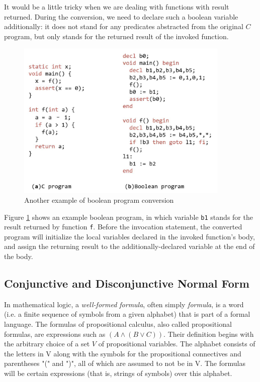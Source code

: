 \documentclass[10pt,journal,final,]{article}
\theoremstyle{definition}
\begin{document}
It would be a little tricky when we are dealing with functions with result returned. During the conversion, we need to declare such a boolean variable additionally: it does not stand for any predicates abstracted from the original $C$ program, but only stands for the returned result of the invoked function.

\begin{figure}
\centering
\includegraphics[width=4in,height=3in]{Fig2-3.jpg}
\caption{Another example of boolean program conversion}
\label{fig:BPC_1}
\end{figure}

Figure \ref{fig:BPC_1} shows an example boolean program, in which variable \lstinline|b1| stands for the result returned by function \lstinline|f|.
Before the invocation statement, the converted program will initialize the local variables declared in the invoked function's body, and assign the returning result to the additionally-declared variable at the end of the body.

\subsection{Conjunctive and Disconjunctive Normal Form}
\label{section:CNF_DNF}
In mathematical logic, a \textit{well-formed formula}, often simply \textit{formula}, is a word (i.e. a finite sequence of symbols from a given alphabet) that is part of a formal language.
The formulas of propositional calculus, also called propositional formulas\cite{FOLaATP}, are expressions such as $(A \wedge (B \vee C))$. Their definition begins with the arbitrary choice of a set $V$ of propositional variables. The alphabet consists of the letters in V along with the symbols for the propositional connectives and parentheses "(" and ")", all of which are assumed to not be in V. The formulas will be certain expressions (that is, strings of symbols) over this alphabet.
\end{document}
